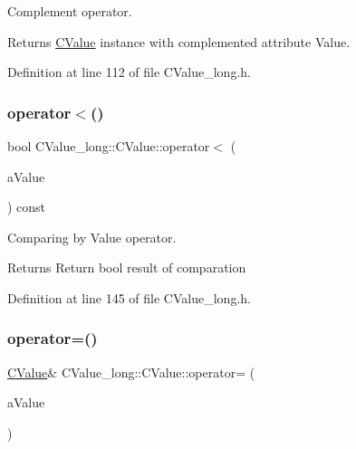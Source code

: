 Complement operator. 

\begin{DoxyReturn}{Returns}
\hyperlink{class_c_value__long_1_1_c_value}{C\+Value} instance with complemented attribute Value. 
\end{DoxyReturn}


Definition at line 112 of file C\+Value\+\_\+long.\+h.

\mbox{\label{class_c_value__long_1_1_c_value_aac5c450ee9d9e61fb6f0a9d87ae21a65}} 
\subsubsection{\texorpdfstring{operator$<$()}{operator<()}}
{\footnotesize\ttfamily bool C\+Value\+\_\+long\+::\+C\+Value\+::operator$<$ (\begin{DoxyParamCaption}\item[{const \hyperlink{class_c_value__long_1_1_c_value}{C\+Value} \&}]{a\+Value }\end{DoxyParamCaption}) const\hspace{0.3cm}{\ttfamily [inline]}}



Comparing by Value operator. 

\begin{DoxyReturn}{Returns}
Return {\ttfamily bool} result of comparation 
\end{DoxyReturn}


Definition at line 145 of file C\+Value\+\_\+long.\+h.

\mbox{\label{class_c_value__long_1_1_c_value_a3d7b5e000597012f1eda152df595b450}} 
\subsubsection{\texorpdfstring{operator=()}{operator=()}}
{\footnotesize\ttfamily \hyperlink{class_c_value__long_1_1_c_value}{C\+Value}\& C\+Value\+\_\+long\+::\+C\+Value\+::operator= (\begin{DoxyParamCaption}\item[{const \hyperlink{class_c_value__long_1_1_c_value}{C\+Value} \&}]{a\+Value }\end{DoxyParamCaption})\hspace{0.3cm}{\ttfamily [inline]}}



